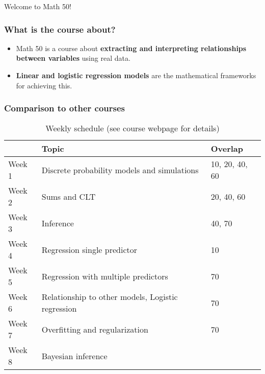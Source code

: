 \documentclass[serif,mathserif]{beamer}
\begin{document}

\begin{frame}
\centering
{\Large {Welcome to Math 50!}}
\centering



\end{frame}

\begin{frame}
\frametitle{What is the course about?}

\begin{itemize}
\item Math 50 is a course about {\bf extracting and interpreting relationships between variables} using real data. 
\item {\bf Linear and logistic regression models} are the mathematical frameworks for achieving this.  
\end{itemize}
\pause




\end{frame}

\begin{frame}
\frametitle{Comparison to other courses}



\end{frame}

\begin{frame} 
\begin{table}[h!]
\centering
\begin{tabular}{lll} 
& Topic & Overlap\\
\hline
\hline
Week 1 & Discrete probability models and simulations & 10, 20, 40, 60   \\
Week 2  & Sums and CLT  & 20, 40, 60 \\
Week 3  & Inference & 40, 70  \\
Week 4  & Regression single predictor & 10 \\
Week 5  & Regression with multiple predictors & 70  \\
Week 6  & Relationship to other models, Logistic regression & 70  \\
Week 7  & Overfitting and regularization & 70  \\
Week 8  & Bayesian inference &   \\
\end{tabular}
\caption{Weekly schedule (see course webpage for details) }
\label{tab:schedule}

\end{table}
\end{frame}
\end{document}

